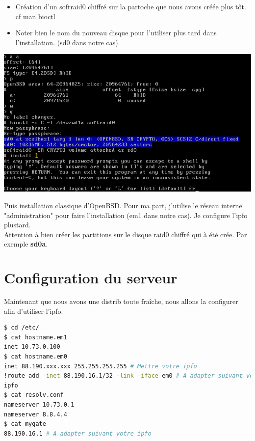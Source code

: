 \documentclass[a4paper,11pt]{article}
\begin{document}
\begin{itemize}
	\item Création d'un softraid0 chiffré sur la partoche que nous avons créée
plus tôt. cf man bioctl
	\item Noter bien le nom du nouveau disque pour l'utiliser plus tard dans
 l'installation. (sd0 dans notre cas).
\end{itemize}

\vspace{5mm}
\includegraphics[scale=0.70]{medias/install.png}
\vspace{5mm}

Puis installation classique d'OpenBSD. Pour ma part, j'utilise le réseau
interne "administration" pour faire l'installation (em1 dans notre cas). 
Je configure l'ipfo plustard.\\
Attention à bien créer les partitions sur le disque raid0 chiffré qui à été crée. Par exemple
{\bf sd0a}.

\section*{Configuration du serveur}

Maintenant que nous avons une distrib toute fraîche, nous allons la configurer
afin d'utiliser l'ipfo.

\vspace{5mm}
\begin{lstlisting}[language=bash,caption={Config. du serveur},frame=bt,breaklines=true]
$ cd /etc/
$ cat hostname.em1
inet 10.73.0.100
$ cat hostname.em0
inet 88.190.xxx.xxx 255.255.255.255 # Mettre votre ipfo
!route add -inet 88.190.16.1/32 -link -iface em0 # A adapter suivant votre
ipfo
$ cat resolv.conf
nameserver 10.73.0.1
nameserver 8.8.4.4 
$ cat mygate
88.190.16.1 # A adapter suivant votre ipfo
\end{lstlisting}
\end{document}
